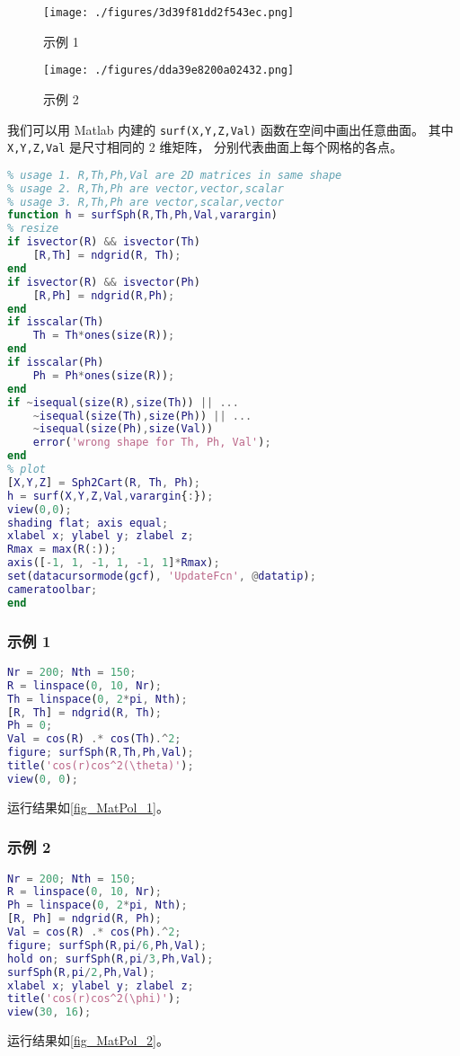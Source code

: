 
\begin{issues}
\issueAbstract
\end{issues}

\begin{figure}[ht]
\centering
\texttt{[image: ./figures/3d39f81dd2f543ec.png]}
\caption{示例 1} \label{fig_MatPol_1}
\end{figure}
\begin{figure}[ht]
\centering
\texttt{[image: ./figures/dda39e8200a02432.png]}
\caption{示例 2} \label{fig_MatPol_2}
\end{figure}

我们可以用 Matlab 内建的 \verb|surf(X,Y,Z,Val)| 函数在空间中画出任意曲面。 其中 \verb|X,Y,Z,Val| 是尺寸相同的 2 维矩阵， 分别代表曲面上每个网格的各点。
\begin{lstlisting}[language=matlab, caption=surfSph.m]
% surf() in spherical coordinate
% usage 1. R,Th,Ph,Val are 2D matrices in same shape
% usage 2. R,Th,Ph are vector,vector,scalar
% usage 3. R,Th,Ph are vector,scalar,vector
function h = surfSph(R,Th,Ph,Val,varargin)
% resize
if isvector(R) && isvector(Th)
    [R,Th] = ndgrid(R, Th);
end
if isvector(R) && isvector(Ph)
    [R,Ph] = ndgrid(R,Ph);
end
if isscalar(Th)
    Th = Th*ones(size(R));
end
if isscalar(Ph)
    Ph = Ph*ones(size(R));
end
if ~isequal(size(R),size(Th)) || ...
    ~isequal(size(Th),size(Ph)) || ...
    ~isequal(size(Ph),size(Val))
    error('wrong shape for Th, Ph, Val');
end
% plot
[X,Y,Z] = Sph2Cart(R, Th, Ph);
h = surf(X,Y,Z,Val,varargin{:});
view(0,0);
shading flat; axis equal;
xlabel x; ylabel y; zlabel z;
Rmax = max(R(:));
axis([-1, 1, -1, 1, -1, 1]*Rmax);
set(datacursormode(gcf), 'UpdateFcn', @datatip);
cameratoolbar;
end
\end{lstlisting}

\subsubsection{示例 1}
\begin{lstlisting}[language=matlab, caption=surfSph\_demo1.m]
Nr = 200; Nth = 150;
R = linspace(0, 10, Nr);
Th = linspace(0, 2*pi, Nth);
[R, Th] = ndgrid(R, Th);
Ph = 0;
Val = cos(R) .* cos(Th).^2;
figure; surfSph(R,Th,Ph,Val);
title('cos(r)cos^2(\theta)');
view(0, 0);
\end{lstlisting}
运行结果如\autoref{fig_MatPol_1}。

\subsubsection{示例 2}
\begin{lstlisting}[language=matlab, caption=surfSph\_demo2.m]
Nr = 200; Nth = 150;
R = linspace(0, 10, Nr);
Ph = linspace(0, 2*pi, Nth);
[R, Ph] = ndgrid(R, Ph);
Val = cos(R) .* cos(Ph).^2;
figure; surfSph(R,pi/6,Ph,Val);
hold on; surfSph(R,pi/3,Ph,Val);
surfSph(R,pi/2,Ph,Val);
xlabel x; ylabel y; zlabel z;
title('cos(r)cos^2(\phi)');
view(30, 16);
\end{lstlisting}
运行结果如\autoref{fig_MatPol_2}。
